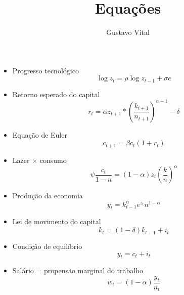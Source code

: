 \documentclass[11pt,a4paper]{article}
\author{Gustavo Vital}
\title{Equações}
\begin{document}
\maketitle
\begin{itemize}
\item Progresso tecnológico
$$\log z_t = \rho \log z_{t-1} + \sigma e$$
\item Retorno esperado do capital
$$r_t = \alpha z_{t+1} * \left(\frac{k_{t+1}}{n_{t+1}}\right)^{\alpha - 1} - \delta$$
\item Equação de Euler
$$c_{t+1} = \beta c_t (1+r_t)$$
\item Lazer $\times$ consumo
$$\psi \frac{c_t}{1-n} = (1-\alpha)z_t \left(\frac{k}{n}\right)^{\alpha}$$
\item Produção da economia
$$y_t = k_{t-1}^{\alpha}e^{z_t}n^{1-\alpha}$$
\item Lei de movimento do capital
$$k_t = (1 - \delta)k_{t-1} + i_t$$
\item Condição de equilíbrio
$$y_t = c_t + i_t$$
\item Salário = propensão marginal do trabalho
$$w_t = (1-\alpha)\frac{y_t}{n_t}$$


\end{itemize}
\end{document}
